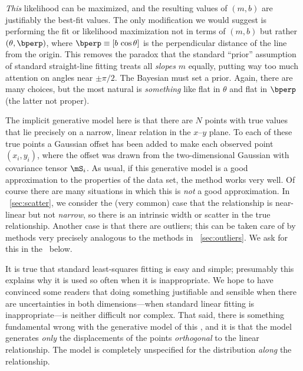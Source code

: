 \documentclass[12pt,twoside,pdftex]{article}
\begin{document}
\emph{This} likelihood can be maximized,
and the resulting values of $(m,b)$ are justifiably the best-fit
values.  The only modification we would suggest is performing the fit
or likelihood maximization not in terms of $(m,b)$ but rather
$(\theta,\bperp)$, where $\bperp\equiv[b\,\cos\theta]$ is the
perpendicular distance of the line from the origin.  This removes the
paradox that the standard ``prior'' assumption of standard
straight-line fitting treats all \emph{slopes} $m$ equally, putting
way too much attention on angles near $\pm\pi/2$.  The Bayesian must
set a prior.  Again, there are many choices, but the most natural
is \emph{something} like flat in $\theta$ and flat in $\bperp$ (the
latter not proper).

The implicit generative model here is that there are $N$ points with
true values that lie precisely on a narrow, linear relation in the
$x$--$y$ plane.  To each of these true points a Gaussian offset has
been added to make each observed point $(x_i,y_i)$, where the offset
was drawn from the two-dimensional Gaussian with covariance tensor
$\mS_i$.  As usual, if this generative model is a good approximation
to the properties of the data set, the method works very well.  Of
course there are many situations in which this is \emph{not} a good
approximation.  In \sectionname~\ref{sec:scatter}, we consider the
(very common) case that the relationship is near-linear but not
\emph{narrow}, so there is an intrinsic width or scatter in the true
relationship.  Another case is that there are outliers; this can be
taken care of by methods very precisely analogous to the methods in
\sectionname~\ref{sec:outliers}.  We ask for this in the
\problemnames\ below.

It is true that standard least-squares fitting is easy and simple;
presumably this explains why it is used so often when it is
inappropriate.  We hope to have convinced some readers that doing
something justifiable and sensible when there are uncertainties in
both dimensions---when standard linear fitting is inappropriate---is
neither difficult nor complex.  That said, there is something
fundamental wrong with the generative model of this \sectionname, and
it is that the model generates \emph{only} the displacements of the
points \emph{orthogonal} to the linear relationship.  The model is
completely unspecified for the distribution \emph{along} the
relationship.
\end{document}
